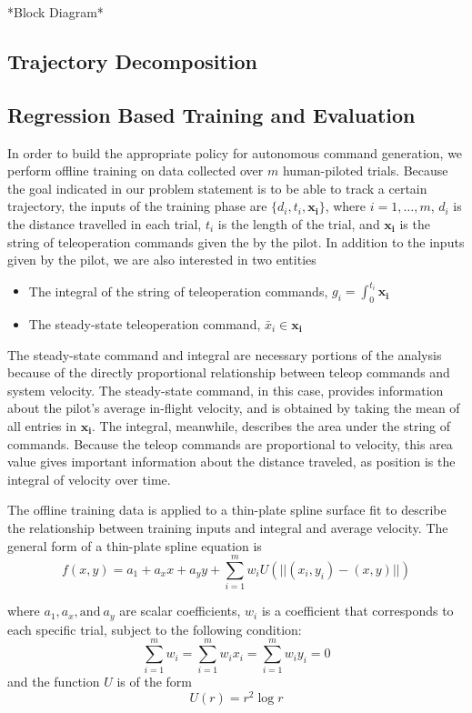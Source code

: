 \documentclass[letterpaper, 10 pt, conference]{ieeeconf}  %
\begin{document}
    *Block Diagram*

\subsection{Trajectory Decomposition}

\subsection{Regression Based Training and Evaluation}
In order to build the appropriate policy for autonomous command generation, we perform offline training on data collected over $m$ human-piloted trials. Because the goal indicated in our problem statement is to be able to track a certain trajectory, the inputs of the training phase are $\{d_i,t_i,\mathbf{x_i}\}$, where $i=1,\ldots,m$, $d_i$ is the distance travelled in each trial, $t_i$ is the length of the trial, and $\mathbf{x_i}$ is the string of teleoperation commands given the by the pilot. In addition to the inputs given by the pilot, we are also interested in two entities \begin{itemize}
    \item The integral of the string of teleoperation commands, $g_i = \int_0^{t_i}\mathbf{x_i}$
    \item The steady-state teleoperation command, $\bar{x}_i \in \mathbf{x_i}$
\end{itemize}
The steady-state command and integral are necessary portions of the analysis because of the directly proportional relationship between teleop commands and system velocity. The steady-state command, in this case, provides information about the pilot's average in-flight velocity, and is obtained by taking the mean of all entries in $\mathbf{x_i}$. The integral, meanwhile, describes the area under the string of commands. Because the teleop commands are proportional to velocity, this area value gives important information about the distance traveled, as position is the integral of velocity over time.

The offline training data is applied to a thin-plate spline surface fit to describe the relationship between training inputs and integral and average velocity. The general form of a thin-plate spline equation is 
\begin{equation}
    f(x,y) = a_1 + a_xx + a_yy + \sum_{i=1}^mw_iU(||(x_i,y_i)-(x,y)||)
\end{equation}

where $a_1,a_x,\text{and}~a_y$ are scalar coefficients, $w_i$ is a coefficient that corresponds to each specific trial, subject to the following condition: \begin{equation}
\sum_{i=1}^mw_i=\sum_{i=1}^mw_ix_i=\sum_{i=1}^mw_iy_i=0
\end{equation}
and the function $U$ is of the form
\begin{equation}
  U(r) = r^2\log{r} 
\end{equation}
\end{document}
